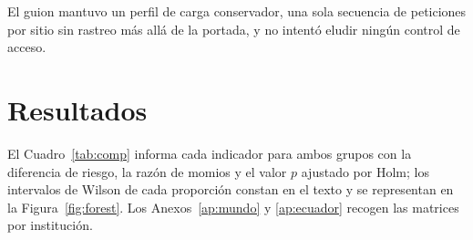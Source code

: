 \documentclass[pdflatex,sn-basic,Numbered]{sn-jnl}
\theoremstyle{thmstyleone}
\theoremstyle{thmstyletwo}
\theoremstyle{thmstylethree}
\begin{document}
El guion mantuvo un perfil de carga conservador, una sola secuencia de peticiones por sitio sin rastreo m\'as all\'a de la portada, y no intent\'o eludir ning\'un control de acceso.

\section{Resultados}\label{sec:results}

El Cuadro~\ref{tab:comp} informa cada indicador para ambos grupos con la diferencia de riesgo, la raz\'on de momios y el valor $p$ ajustado por Holm; los intervalos de Wilson de cada proporci\'on constan en el texto y se representan en la Figura~\ref{fig:forest}. Los Anexos~\ref{ap:mundo} y \ref{ap:ecuador} recogen las matrices por instituci\'on.
\end{document}
